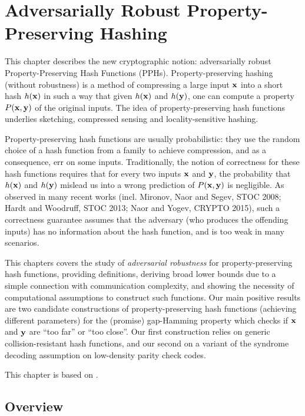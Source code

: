 
\chapter{Adversarially Robust Property-Preserving Hashing}\label{chap:PPH}
This chapter describes the new cryptographic notion: adversarially robust Property-Preserving Hash Functions (PPHs). Property-preserving hashing (without robustness) is a method of compressing a large input $\mathbf{{x}}$ into a short hash $h(\mathbf{{x}})$ in such a way that given $h(\mathbf{{x}})$ and $h(\mathbf{{y}})$, one can compute a property $P(\mathbf{{x}},\mathbf{{y}})$ of the original inputs. The idea of property-preserving hash functions underlies sketching, compressed sensing and locality-sensitive hashing.

Property-preserving hash functions are usually probabilistic: they use the random choice of a hash function from a family to achieve compression, and as a consequence, err on some inputs. Traditionally, the notion of correctness for these hash functions requires that for every two inputs $\mathbf{{x}}$ and $\mathbf{{y}}$, the probability that $h(\mathbf{{x}})$ and $h(\mathbf{{y}})$ mislead us into a wrong prediction of $P(\mathbf{{x}},\mathbf{{y}})$ is negligible. As observed in many recent works (incl. Mironov, Naor and Segev, STOC 2008; Hardt and Woodruff, STOC 2013; Naor and Yogev, CRYPTO 2015), such a correctness guarantee assumes that the adversary (who produces the offending inputs) has no information about the hash function, and is too weak in many scenarios.

This chapters covers the study of {\em adversarial robustness} for property-preserving hash functions, providing definitions, deriving broad lower bounds due to a simple connection with communication complexity, and showing the necessity of computational assumptions to construct such functions. Our main positive results are two candidate constructions of property-preserving hash functions (achieving different parameters) for the (promise) gap-Hamming property which checks if $\mathbf{{x}}$ and $\mathbf{{y}}$ are ``too far'' or ``too close''. Our first construction relies on generic collision-resistant hash functions, and our second on a variant of the syndrome decoding assumption on low-density parity check codes.

This chapter is based on \cite{BLV19}.

\section{Overview}\label{sec:pph-intro}



